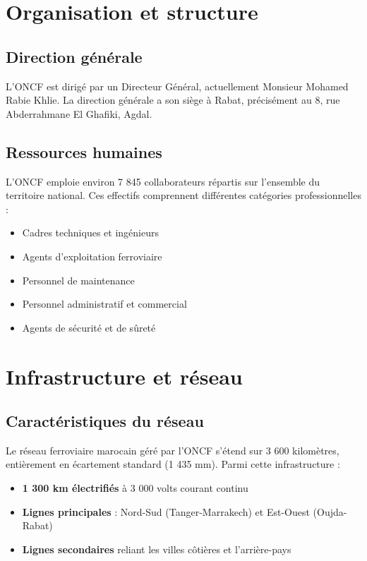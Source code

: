 \section{Organisation et structure}

\subsection{Direction générale}

L'ONCF est dirigé par un Directeur Général, actuellement Monsieur Mohamed Rabie Khlie. La direction générale a son siège à Rabat, précisément au 8, rue Abderrahmane El Ghafiki, Agdal.

\subsection{Ressources humaines}

L'ONCF emploie environ 7 845 collaborateurs répartis sur l'ensemble du territoire national. Ces effectifs comprennent différentes catégories professionnelles :
\begin{itemize}
    \item Cadres techniques et ingénieurs
    \item Agents d'exploitation ferroviaire
    \item Personnel de maintenance
    \item Personnel administratif et commercial
    \item Agents de sécurité et de sûreté
\end{itemize}

\section{Infrastructure et réseau}

\subsection{Caractéristiques du réseau}

Le réseau ferroviaire marocain géré par l'ONCF s'étend sur 3 600 kilomètres, entièrement en écartement standard (1 435 mm). Parmi cette infrastructure :
\begin{itemize}
    \item \textbf{1 300 km électrifiés} à 3 000 volts courant continu
    \item \textbf{Lignes principales} : Nord-Sud (Tanger-Marrakech) et Est-Ouest (Oujda-Rabat)
    \item \textbf{Lignes secondaires} reliant les villes côtières et l'arrière-pays
\end{itemize}

